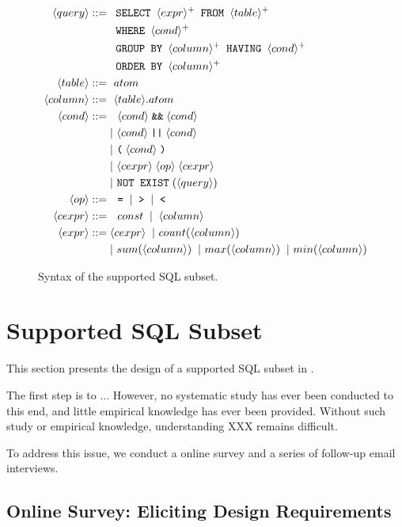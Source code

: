 \begin{figure}[t]
\footnotesize%
\begin{align*}
\langle query\rangle ::= {} 
	& \texttt{ SELECT } \langle expr\rangle^+ \texttt{ FROM } \langle table\rangle^+ \\
        & \texttt{ WHERE } \langle cond\rangle^+ \\ 
	&  \texttt{ GROUP BY } \langle column\rangle^+ \texttt{ HAVING } \langle cond\rangle^+\\
	&  \texttt{ ORDER BY } \langle column\rangle^+ \\
\langle table\rangle::= {} &\ atom \\
\langle column\rangle ::= {} &\ \langle table\rangle.atom\\
\langle cond\rangle ::= {} &\ \ \langle cond\rangle \;\texttt{\&\&}\; \langle cond\rangle \\ 
    & |\ \langle cond\rangle \;\texttt{||}\; \langle cond\rangle \\
    & |\ \texttt{(}\;\langle cond\rangle\;\texttt{)} \\
    & |\ \langle cexpr\rangle \;\langle op\rangle\; \langle cexpr\rangle \\
    & |\ \texttt{NOT EXIST} \;(\langle query\rangle) \\
\langle op\rangle ::= {} &\ \ \texttt{=} \;\;|\;\; \texttt{>}  \;\;|\;\; \texttt{<}\\
\langle cexpr\rangle ::= {} &\ \ const \;\;|\;\; \langle column\rangle  \;\; \\
\langle expr\rangle ::= {} & \langle cexpr\rangle \;\;|\ count(\langle column\rangle) \\
    & |\ sum(\langle column\rangle) \;\;|\ max(\langle column\rangle) \;\;|\ min(\langle column\rangle) 
\end{align*}
\normalsize%
\caption{Syntax of the supported SQL subset.}
\label{fig:syntax}
\end{figure}


\section{Supported SQL Subset}
\label{sec:langsubset}

This section presents the design of
a supported SQL subset in \ourtool.

The first step is to ... \todo{}
However, no systematic study has ever been conducted to this end, 
and little empirical knowledge has ever been provided. Without 
such study or empirical knowledge, understanding XXX
 remains difficult.

To address this issue, we conduct a online survey
and a series of follow-up email interviews.

\subsection{Online Survey: Eliciting Design Requirements}

